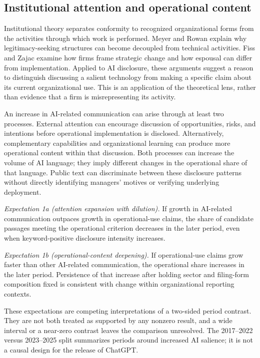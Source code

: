 \documentclass[12pt]{article}
\begin{document}
\subsection{Institutional attention and operational content}

Institutional theory separates conformity to recognized organizational forms
from the activities through which work is performed. Meyer and Rowan
\citep{meyer1977institutionalized} explain why legitimacy-seeking structures
can become decoupled from technical activities. Fiss and Zajac
\citep{fiss2006symbolic} examine how firms frame strategic change and how
espousal can differ from implementation. Applied to AI disclosure, these
arguments suggest a reason to distinguish discussing a salient technology
from making a specific claim about its current organizational use. This is
an application of the theoretical lens, rather than evidence that a firm is
misrepresenting its activity.

An increase in AI-related communication can arise through at least two
processes. External attention can encourage discussion of opportunities,
risks, and intentions before operational implementation is disclosed.
Alternatively, complementary capabilities and organizational learning can
produce more operational content within that discussion. Both processes can
increase the volume of AI language; they imply different changes in the
operational share of that language. Public text can discriminate between
these disclosure patterns without directly identifying managers' motives or
verifying underlying deployment.

\textit{Expectation 1a (attention expansion with dilution).} If growth in
AI-related communication outpaces growth in operational-use claims, the share
of candidate passages meeting the operational criterion decreases in the
later period, even when keyword-positive disclosure intensity increases.

\textit{Expectation 1b (operational-content deepening).} If operational-use
claims grow faster than other AI-related communication, the operational
share increases in the later period. Persistence of that increase after
holding sector and filing-form composition fixed is consistent with change
within organizational reporting contexts.

These expectations are competing interpretations of a two-sided period
contrast. They are not both treated as supported by any nonzero result, and a
wide interval or a near-zero contrast leaves the comparison unresolved. The
2017--2022 versus 2023--2025 split summarizes periods around increased
AI salience; it is not a causal design for the release of ChatGPT.
\end{document}
